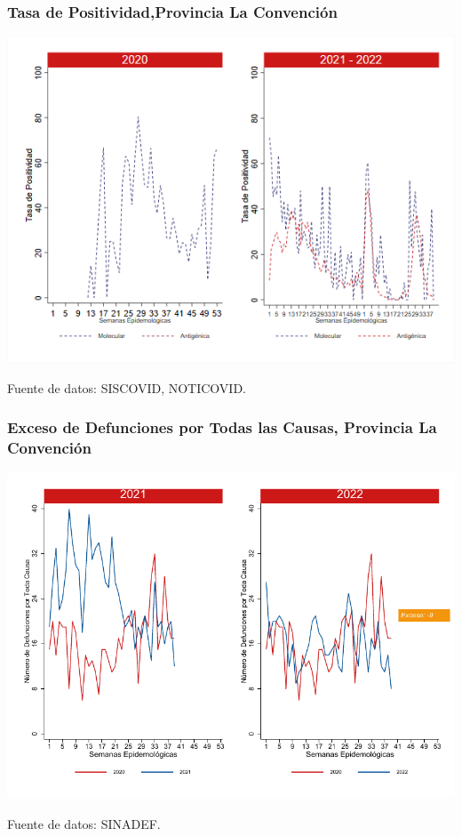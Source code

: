 \documentclass[xcolor=table]{beamer}
\begin{document}
\begin{frame}
	\frametitle{Tasa de Positividad,Provincia La Convención}
	\vspace{-.5cm}
	\begin{center}
		\includegraphics[width=0.8\linewidth, trim={0cm .5cm 0cm 0.2cm},clip]{../figuras/positividad_20_21_9.png}
	\end{center}
	{\tiny Fuente de datos: SISCOVID, NOTICOVID.}
\end{frame}

\begin{frame}
	\frametitle{Exceso de Defunciones por Todas las Causas, Provincia La Convención}
	\vspace{-.5cm}
	\begin{center}
		\includegraphics[width=0.8\linewidth, trim={0cm .5cm 0cm 0.2cm},clip]{../figuras/exceso_9.pdf}
	\end{center}
	{\tiny Fuente de datos: SINADEF.}
	
	\hyperlink{indicadores_provinciales}{}
\end{frame}
\end{document}
